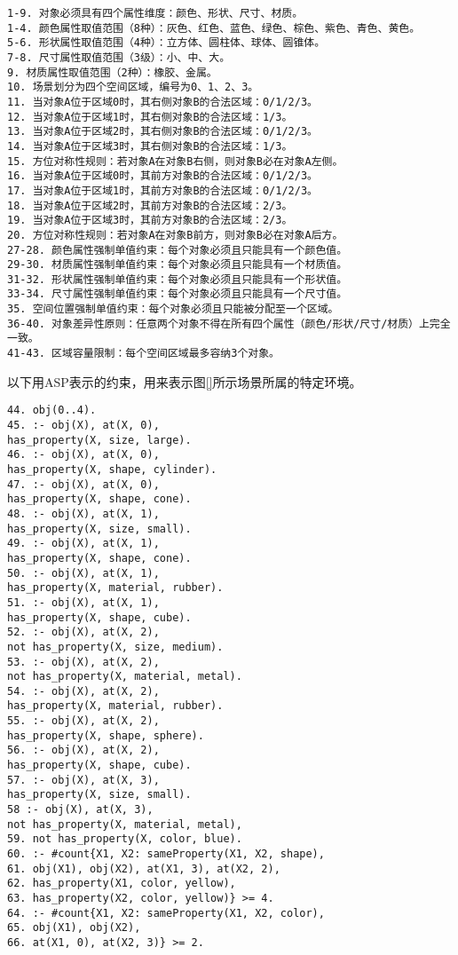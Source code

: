 \begin{lstlisting}
1-9. 对象必须具有四个属性维度：颜色、形状、尺寸、材质。
1-4. 颜色属性取值范围（8种）：灰色、红色、蓝色、绿色、棕色、紫色、青色、黄色。
5-6. 形状属性取值范围（4种）：立方体、圆柱体、球体、圆锥体。
7-8. 尺寸属性取值范围（3级）：小、中、大。
9. 材质属性取值范围（2种）：橡胶、金属。
10. 场景划分为四个空间区域，编号为0、1、2、3。
11. 当对象A位于区域0时，其右侧对象B的合法区域：0/1/2/3。
12. 当对象A位于区域1时，其右侧对象B的合法区域：1/3。
13. 当对象A位于区域2时，其右侧对象B的合法区域：0/1/2/3。
14. 当对象A位于区域3时，其右侧对象B的合法区域：1/3。
15. 方位对称性规则：若对象A在对象B右侧，则对象B必在对象A左侧。
16. 当对象A位于区域0时，其前方对象B的合法区域：0/1/2/3。
17. 当对象A位于区域1时，其前方对象B的合法区域：0/1/2/3。
18. 当对象A位于区域2时，其前方对象B的合法区域：2/3。
19. 当对象A位于区域3时，其前方对象B的合法区域：2/3。
20. 方位对称性规则：若对象A在对象B前方，则对象B必在对象A后方。
27-28. 颜色属性强制单值约束：每个对象必须且只能具有一个颜色值。
29-30. 材质属性强制单值约束：每个对象必须且只能具有一个材质值。
31-32. 形状属性强制单值约束：每个对象必须且只能具有一个形状值。
33-34. 尺寸属性强制单值约束：每个对象必须且只能具有一个尺寸值。
35. 空间位置强制单值约束：每个对象必须且只能被分配至一个区域。
36-40. 对象差异性原则：任意两个对象不得在所有四个属性（颜色/形状/尺寸/材质）上完全一致。
41-43. 区域容量限制：每个空间区域最多容纳3个对象。
\end{lstlisting}
以下用ASP表示的约束，用来表示图\ref{}所示场景所属的特定环境。
\begin{lstlisting}
44. obj(0..4).
45. :- obj(X), at(X, 0),
has_property(X, size, large).
46. :- obj(X), at(X, 0),
has_property(X, shape, cylinder).
47. :- obj(X), at(X, 0),
has_property(X, shape, cone).
48. :- obj(X), at(X, 1),
has_property(X, size, small).
49. :- obj(X), at(X, 1),
has_property(X, shape, cone).
50. :- obj(X), at(X, 1),
has_property(X, material, rubber).
51. :- obj(X), at(X, 1),
has_property(X, shape, cube).
52. :- obj(X), at(X, 2),
not has_property(X, size, medium).
53. :- obj(X), at(X, 2),
not has_property(X, material, metal).
54. :- obj(X), at(X, 2),
has_property(X, material, rubber).
55. :- obj(X), at(X, 2),
has_property(X, shape, sphere).
56. :- obj(X), at(X, 2),
has_property(X, shape, cube).
57. :- obj(X), at(X, 3),
has_property(X, size, small).
58 :- obj(X), at(X, 3),
not has_property(X, material, metal),
59. not has_property(X, color, blue).
60. :- #count{X1, X2: sameProperty(X1, X2, shape),
61. obj(X1), obj(X2), at(X1, 3), at(X2, 2),
62. has_property(X1, color, yellow),
63. has_property(X2, color, yellow)} >= 4.
64. :- #count{X1, X2: sameProperty(X1, X2, color),
65. obj(X1), obj(X2),
66. at(X1, 0), at(X2, 3)} >= 2.
\end{lstlisting}
